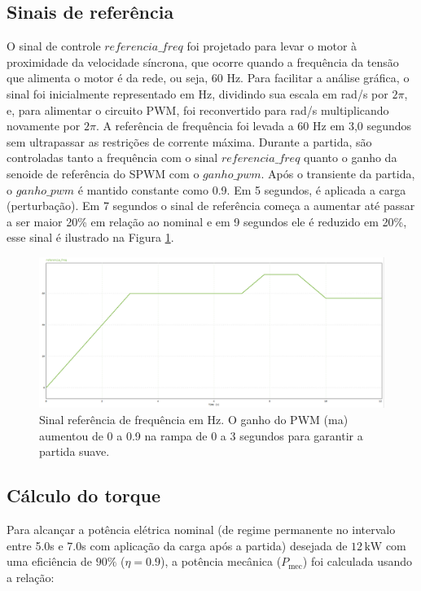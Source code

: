 \documentclass[a4paper, 11pt]{article}
\begin{document}
\subsection{Sinais de referência}
O sinal de controle $referencia\_freq$ foi projetado para levar o motor à proximidade da velocidade síncrona, que ocorre quando a frequência da tensão que alimenta o motor é da rede, ou seja, 60 Hz. Para facilitar a análise gráfica, o sinal foi inicialmente representado em Hz, dividindo sua escala em rad/s por \(2\pi\), e, para alimentar o circuito PWM, foi reconvertido para rad/s multiplicando novamente por \(2\pi\). A referência de frequência foi levada a 60 Hz em 3,0 segundos sem ultrapassar as restrições de corrente máxima. Durante a partida, são controladas tanto a frequência com o sinal $referencia\_freq$ quanto o ganho da senoide de referência do SPWM com o $ganho\_pwm$. Após o transiente da partida, o $ganho\_pwm$ é mantido constante como 0.9. Em 5 segundos, é aplicada a carga (perturbação). Em 7 segundos o sinal de referência começa a aumentar até passar a ser maior 20\% em relação ao nominal e em 9 segundos ele é reduzido em 20\%, esse sinal é ilustrado na Figura \ref{fig:sinal_ref_freq}.

\begin{figure}[H]
    \centering
    \includegraphics[width=1\linewidth]{correcao_images/corre_ref.png}
    \caption{Sinal referência de frequência em Hz. O ganho do PWM (ma) aumentou de 0 a 0.9 na rampa de 0 a 3 segundos para garantir a partida suave.}
    \label{fig:sinal_ref_freq}
\end{figure}

\subsection{Cálculo do torque}

Para alcançar a potência elétrica nominal (de regime permanente no intervalo entre 5.0s e 7.0s com aplicação da carga após a partida) desejada de \(12\,\mathrm{kW}\) com uma eficiência de \(90\%\) (\(\eta = 0.9\)), a potência mecânica (\(P_{\text{mec}}\)) foi calculada usando a relação:
\end{document}

